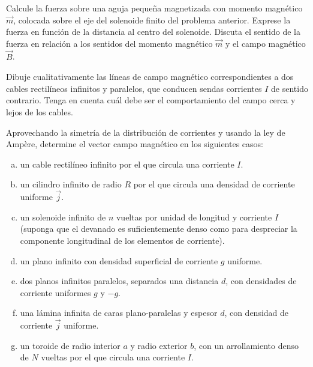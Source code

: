 \documentclass[problemas]{guia}
\begin{document}
\begin{problema}{}
    Calcule la fuerza sobre una aguja pequeña magnetizada con momento 
    magnético $\vec{m}$, colocada sobre el eje del solenoide finito del 
    problema anterior. Exprese la fuerza en función de la distancia al centro 
    del solenoide. Discuta el sentido de la fuerza en relación a los sentidos 
    del momento magnético $\vec{m}$ y el campo magnético $\vec{B}$.
\end{problema}

\begin{problema}{}
    Dibuje cualitativamente las líneas de campo magnético correspondientes a 
    dos cables rectilíneos infinitos y paralelos, que conducen sendas 
    corrientes $I$ de sentido contrario. Tenga en cuenta cuál debe ser el 
    comportamiento del campo cerca y lejos de los cables.
\end{problema}

\begin{problema}{}
    Aprovechando la simetría de la distribución de corrientes y usando la 
    ley de Ampère, determine el vector campo magnético en los siguientes casos:
    \begin{enumerate}[(a)]
        \item un cable rectilíneo infinito por el que circula una 
            corriente $I$.
        \item un cilindro infinito de radio $R$ por el que circula una densidad
            de corriente uniforme $\vec{j}$.
        \item un solenoide infinito de $n$ vueltas por unidad de longitud y 
            corriente $I$ (suponga que el devanado es suficientemente denso 
            como para despreciar la componente longitudinal de los elementos 
            de corriente).
        \item un plano infinito con densidad superficial de corriente $g$ 
            uniforme.
        \item dos  planos  infinitos  paralelos,  separados  una  distancia  
            $d$,  con  densidades  de  corriente uniformes $g$ y $-g$.
        \item una lámina infinita de caras plano-paralelas y espesor $d$, con 
            densidad de corriente $\vec{j}$ uniforme.
        \item un toroide de radio interior $a$ y radio exterior $b$, con un 
            arrollamiento denso de $N$ vueltas por el que circula una 
            corriente $I$.
    \end{enumerate}
\end{problema}
\end{document}
